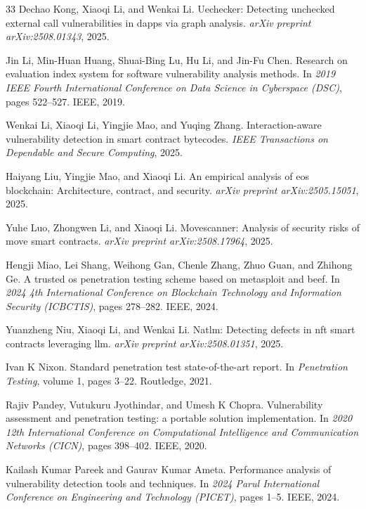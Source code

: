 \documentclass[conference]{IEEEtran}
\begin{document}
\begin{thebibliography}{33}
Dechao Kong, Xiaoqi Li, and Wenkai Li. 
Uechecker: Detecting unchecked external call vulnerabilities in dapps via graph analysis. 
\emph{arXiv preprint arXiv:2508.01343}, 2025.

Jin Li, Min-Huan Huang, Shuai-Bing Lu, Hu Li, and Jin-Fu Chen. 
Research on evaluation index system for software vulnerability analysis methods. 
In \emph{2019 IEEE Fourth International Conference on Data Science in Cyberspace (DSC)}, pages 522--527. IEEE, 2019.

Wenkai Li, Xiaoqi Li, Yingjie Mao, and Yuqing Zhang. 
Interaction-aware vulnerability detection in smart contract bytecodes. 
\emph{IEEE Transactions on Dependable and Secure Computing}, 2025.

Haiyang Liu, Yingjie Mao, and Xiaoqi Li. 
An empirical analysis of eos blockchain: Architecture, contract, and security. 
\emph{arXiv preprint arXiv:2505.15051}, 2025.

Yuhe Luo, Zhongwen Li, and Xiaoqi Li. 
Movescanner: Analysis of security risks of move smart contracts. 
\emph{arXiv preprint arXiv:2508.17964}, 2025.

Hengji Miao, Lei Shang, Weihong Gan, Chenle Zhang, Zhuo Guan, and Zhihong Ge. 
A trusted os penetration testing scheme based on metasploit and beef. 
In \emph{2024 4th International Conference on Blockchain Technology and Information Security (ICBCTIS)}, pages 278--282. IEEE, 2024.

Yuanzheng Niu, Xiaoqi Li, and Wenkai Li. 
Natlm: Detecting defects in nft smart contracts leveraging llm. 
\emph{arXiv preprint arXiv:2508.01351}, 2025.

Ivan K Nixon. 
Standard penetration test state-of-the-art report. 
In \emph{Penetration Testing}, volume 1, pages 3--22. Routledge, 2021.

Rajiv Pandey, Vutukuru Jyothindar, and Umesh K Chopra. 
Vulnerability assessment and penetration testing: a portable solution implementation. 
In \emph{2020 12th International Conference on Computational Intelligence and Communication Networks (CICN)}, pages 398--402. IEEE, 2020.

Kailash Kumar Pareek and Gaurav Kumar Ameta. 
Performance analysis of vulnerability detection tools and techniques. 
In \emph{2024 Parul International Conference on Engineering and Technology (PICET)}, pages 1--5. IEEE, 2024.


\end{thebibliography}
\end{document}
